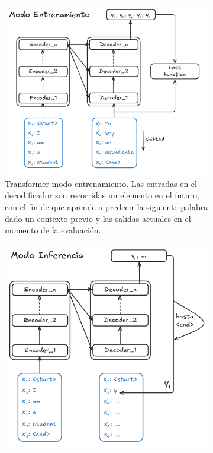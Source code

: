 \begin{figure}[ht!]
    \centering
    \begin{subfigure}[b]{0.49\textwidth}
        \centering
        \includegraphics[width=1.0 \textwidth]{Chapters/2. Transformer/Figures/transformer/train.png}
        \caption{Transformer modo entrenamiento. Las entradas en el decodificador son recorridas un
                 elemento en el futuro, con el fin de que aprende a predecir la siguiente palabra
                 dado un contexto previo y las salidas actuales en el momento de la evaluación.}
        \label{fig:trans_train}
    \end{subfigure}
    \begin{subfigure}[b]{0.49\textwidth}
        \centering
        \includegraphics[width=1.0 \textwidth]{Chapters/2. Transformer/Figures/transformer/inference.png}

\end{subfigure}
\end{figure}
